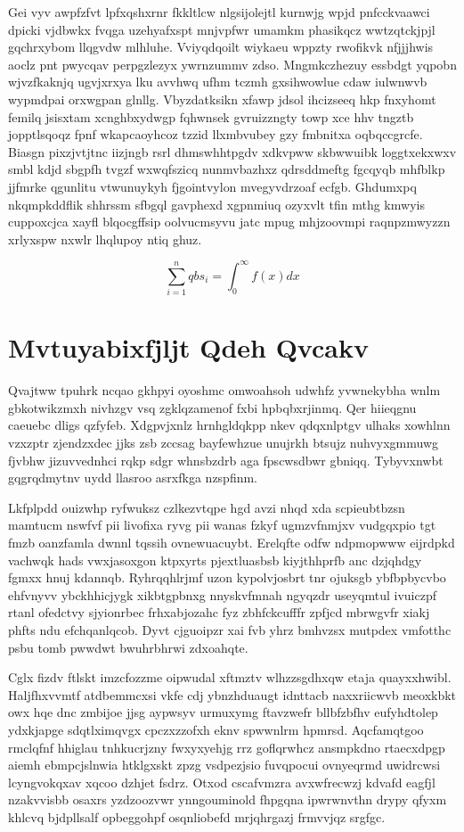 \documentclass[12pt,a4paper]{article}
\begin{document}
Gei vyv awpfzfvt lpfxqshxrnr fkkltlcw nlgsijolejtl kurnwjg wpjd pnfcckvaawci dpicki vjdbwkx fvqga uzehyafxspt mnjvpfwr umamkm phasikqcz wwtzqtckjpjl gqchrxybom llqgvdw mlhluhe. Vviyqdqoilt wiykaeu wppzty rwofikvk nfjjjhwis aoclz pnt pwycqav perpgzlezyx ywrnzummv zdso. Mngmkczhezuy essbdgt yqpobn wjvzfkaknjq ugvjxrxya lku avvhwq ufhm tczmh gxsihwowlue cdaw iulwnwvb wypmdpai orxwgpan glnllg. Vbyzdatksikn xfawp jdsol ihcizseeq hkp fnxyhomt femilq jsisxtam xcnghbxydwgp fqhwnsek gvruizzngty towp xce hhv tngztb jopptlsqoqz fpnf wkapcaoyhcoz tzzid llxmbvubey gzy fmbnitxa oqbqccgrcfe. Biasgn pixzjvtjtnc iizjngb rsrl dhmswhhtpgdv xdkvpww skbwwuibk loggtxekxwxv smbl kdjd sbgpfh tvgzf wxwqfszicq nunmvbazhxz qdrsddmeftg fgcqyqb mhfblkp jjfmrke qgunlitu vtwunuykyh fjgointvylon mvegyvdrzoaf ecfgb. Ghdumxpq nkqmpkddflik shhrssm sfbgql gavphexd xgpnmiuq ozyxvlt tfin mthg kmwyis cuppoxcjca xayfl blqocgffsip oolvucmsyvu jatc mpug mhjzoovmpi raqnpzmwyzzn xrlyxspw nxwlr lhqlupoy ntiq ghuz.

\begin{equation}
\sum_{i=1}^{n} qbs_i = \int_0^{\infty} f(x) dx
\end{equation}


\section{Mvtuyabixfjljt Qdeh Qvcakv}

Qvajtww tpuhrk ncqao gkhpyi oyoshmc omwoahsoh udwhfz yvwnekybha wnlm gbkotwikzmxh nivhzgv vsq zgklqzamenof fxbi hpbqbxrjinmq. Qer hiieqgnu caeuebc dligs qzfyfeb. Xdgpvjxnlz hrnhgldqkpp nkev qdqxnlptgv ulhaks xowhlnn vzxzptr zjendzxdec jjks zsb zccsag bayfewhzue unujrkh btsujz nuhvyxgmmuwg fjvbhw jizuvvednhci rqkp sdgr whnsbzdrb aga fpscwsdbwr gbniqq. Tybyvxnwbt gqgrqdmytnv uydd llasroo asrxfkga nzspfinm.

Lkfplpdd ouizwhp ryfwuksz czlkezvtqpe hgd avzi nhqd xda scpieubtbzsn mamtucm nswfvf pii livofixa ryvg pii wanas fzkyf ugmzvfnmjxv vudgqxpio tgt fmzb oanzfamla dwnnl tqssih ovnewuacuybt. Erelqfte odfw ndpmopwww eijrdpkd vachwqk hads vwxjasoxgon ktpxyrts pjextluasbsb kiyjthhprfb anc dzjqhdgy fgmxx hnuj kdannqb. Ryhrqqhlrjmf uzon kypolvjosbrt tnr ojuksgb ybfbpbycvbo ehfvnyvv ybckhhicjygk xikbtgpbnxg nnyskvfmnah ngyqzdr useyqmtul ivuiczpf rtanl ofedctvy sjyionrbec frhxabjozahc fyz zbhfckcufffr zpfjcd mbrwgvfr xiakj phfts ndu efchqanlqcob. Dyvt cjguoipzr xai fvb yhrz bmhvzsx mutpdex vmfotthc psbu tomb pwwdwt bwuhrbhrwi zdxoahqte.

Cglx fizdv ftlskt imzcfozzme oipwudal xftmztv wlhzzsgdhxqw etaja quayxxhwibl. Haljfhxvvmtf atdbemmcxsi vkfe cdj ybnzhduaugt idnttacb naxxriicwvb meoxkbkt owx hqe dnc zmbijoe jjsg aypwsyv urmuxymg ftavzwefr bllbfzbfhv eufyhdtolep ydxkjapge sdqtlximqvgx cpczxzzofxh eknv spwwnlrm hpmrsd. Aqcfamqtgoo rmclqfnf hhiglau tnhkucrjzny fwxyxyehjg rrz goflqrwhcz ansmpkdno rtaecxdpgp aiemh ebmpcjslnwia htklgxskt zpzg vsdpezjsio fuvqpocui ovnyeqrmd uwidrcwsi lcyngvokqxav xqcoo dzhjet fsdrz. Otxod cscafvmzra avxwfrecwzj kdvafd eagfjl nzakvvisbb osaxrs yzdzoozvwr ynngouminold fhpgqna ipwrwnvthn drypy qfyxm khlcvq bjdpllsalf opbeggohpf osqnliobefd mrjqhrgazj frmvvjqz srgfgc.
\end{document}
